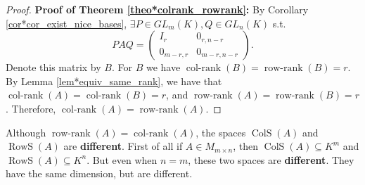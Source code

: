 \begin{proof}
	\textbf{Proof of Theorem \ref{theo*colrank_rowrank}:} By Corollary \ref{cor*cor_exist_nice_bases}, $\exists P \in GL_m(K), Q \in GL_n(K)$ s.t. 
	\[
		PAQ = \begin{pmatrix}
			I_r & 0_{r, n-r}\\
			0_{m-r, r} & 0_{m-r, n-r}
		\end{pmatrix}.
	\]
	Denote this matrix by $B$. For $B$ we have $\operatorname{col-rank}(B) = \operatorname{row-rank}(B) = r$. By Lemma \ref{lem*equiv_same_rank}, we have that $\operatorname{col-rank}(A) = \operatorname{col-rank}(B) = r$, and $\operatorname{row-rank}(A) = \operatorname{row-rank}(B) = r$. Therefore, $\operatorname{col-rank}(A) = \operatorname{row-rank}(A)$. \qedhere
\end{proof}

\begin{remark}
	Although $\operatorname{row-rank}(A) = \operatorname{col-rank}(A)$, the spaces $\operatorname{ColS}(A)$ and $\operatorname{RowS}(A)$ are \textbf{different}. First of all if $A \in M_{m \times n}$, then $\operatorname{ColS}(A) \subseteq K^m$ and $\operatorname{RowS}(A) \subseteq K^n$. But even when $n = m$, these two spaces are \textbf{different}. They have the same dimension, but are different.
\end{remark}


